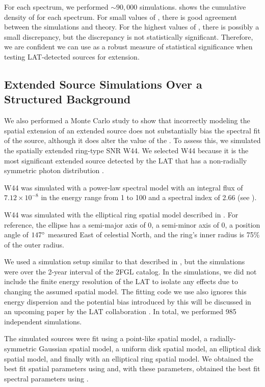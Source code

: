 For each spectrum, we performed $\sim90,000$ simulations.
 shows the cumulative density
of \tsext for each spectrum. For small values of \tsext,
there is good agreement between the simulations and
theory.  For the highest values of \tsext, there is possibly
a small discrepancy, but the discrepancy is not statistically significant.
Therefore, we are confident we can use \tsext as a robust measure of
statistical significance when testing LAT-detected sources for extension.

\subsection{Extended Source Simulations Over a Structured Background}

We also performed a Monte Carlo study to show that incorrectly modeling the
spatial extension of an extended source does not substantially bias
the spectral fit of the source, although it does alter the value of the \ts.
To assess this, we simulated the spatially extended ring-type SNR W44.
We selected W44 because it is the most significant extended source detected by the LAT 
that has a non-radially symmetric photon distribution \citep{abdo_2010a_gamma-ray-emission}. 

W44 was simulated with a power-law spectral model with an integral flux
of $7.12\times10^{-8}$ \fluxunits in the energy range from 1 \gev to 100
\gev and a spectral index of 2.66 (see ).

W44 was simulated with the elliptical ring spatial model described in
\cite{abdo_2010a_gamma-ray-emission}. For reference, the ellipse has a semi-major axis of 0,
a semi-minor axis of 0, a position angle of $147^\circ$
measured East of celestial North, and the ring's inner radius is 75\% of
the outer radius.

We used a simulation setup similar to that described in
, but the simulations
were over the 2-year interval of the 2FGL catalog.
In the simulations, 
we did not include the finite energy resolution of the LAT
to isolate any effects due to changing the assumed spatial model. 
The fitting code we use also ignores this energy dispersion and the
potential bias introduced by this will be discussed in an upcoming paper
by the LAT collaboration \citep{ackermann_2012a_fermi-large}.
In total, we performed 985 independent simulations.

The simulated sources were fit using a point-like spatial model,
a radially-symmetric Gaussian spatial model, a uniform disk spatial model, 
an elliptical disk spatial model, and finally with an elliptical
ring spatial model.
We obtained the best fit spatial parameters using \pointlike and, 
with these parameters, obtained the best fit spectral parameters 
using \gtlike. 

